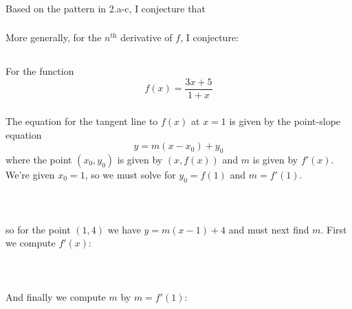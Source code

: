 \documentclass{article}
\begin{document}
\subsubsection{}
Based on the pattern in 2.a-c, I conjecture that
\\

\quad
\Longunderstack[l]{
\phantom{ }
}

\subsubsection{}
More generally, for the $n^{\text{th}}$ derivative of $f$, I conjecture:
\\

\quad
\Longunderstack[l]{
\phantom{ }
}

\subsection{}
For the function
$$
f(x) = \frac{3x+5}{1+x}
$$

\subsubsection{}
The equation for the tangent line to $f(x)$ at $x=1$ is given by the point-slope equation
$$
y = m(x-x_0) + y_0
$$
where the point $(x_0, y_0)$ is given by $(x, f(x))$ and $m$ is given by $f'(x)$. We're given $x_0=1$, so we must solve for $y_0 = f(1)$ and $m = f'(1)$.
\\

\\
\\
\\
so for the point $(1, 4)$ we have $y = m(x-1) + 4$ and must next find $m$. First we compute $f'(x)$:
\\

\quad
{}
\\
\\
\\
And finally we compute $m$ by $m=f'(1)$:
\\
\end{document}
